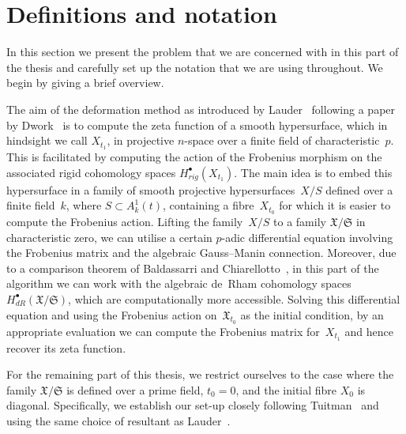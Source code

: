 

\section{Definitions and notation}

In this section we present the problem that we are concerned 
with in this part of the thesis and carefully set up the notation 
that we are using throughout.  We begin by giving a brief overview.

The aim of the deformation method as introduced by 
Lauder~\citep{Lau04} following a paper by Dwork~\citep{Dwork62b} 
is to compute the zeta function of a smooth 
hypersurface, which in hindsight we call $X_{t_1}$, in projective 
$n$-space over a finite field of characteristic~$p$.  This is 
facilitated by computing 
the action of the Frobenius morphism on the associated rigid cohomology 
spaces $H_{rig}^{\bullet}(X_{t_1})$.  The main idea is to embed this 
hypersurface in a family of smooth projective hypersurfaces~$X/S$ 
defined over a finite field~$k$, where $S \subset A_k^1(t)$, containing 
a fibre~$X_{t_0}$ for which it is easier to compute the Frobenius action. 
Lifting the family~$X/S$ to a family $\mathfrak{X}/\mathfrak{S}$ in 
characteristic zero, we can utilise a certain $p$-adic differential 
equation involving the Frobenius matrix and the algebraic Gauss--Manin 
connection.  Moreover, due to a comparison theorem of Baldassarri and 
Chiarellotto~\citep{BalChi94}, in this 
part of the algorithm we can work with the algebraic de~Rham cohomology 
spaces~$H_{dR}^{\bullet}(\mathfrak{X}/\mathfrak{S})$, which are 
computationally more accessible.  Solving this differential equation 
and using the Frobenius action on~$\mathfrak{X}_{t_0}$ as the initial 
condition, by an appropriate evaluation we can compute the Frobenius matrix 
for~$X_{t_1}$ and hence recover its zeta function.

For the remaining part of this thesis, we restrict ourselves to the case 
where the family $\mathfrak{X}/\mathfrak{S}$ is defined over a prime field, 
$t_0 = 0$, and the initial fibre $X_0$ is diagonal.  Specifically, we 
establish our set-up closely following Tuitman~\citep[\S 3.6]{Tuitman2011} 
and using the same choice of resultant as Lauder~\citep[\S 2.3.2]{Lauder2011}.

